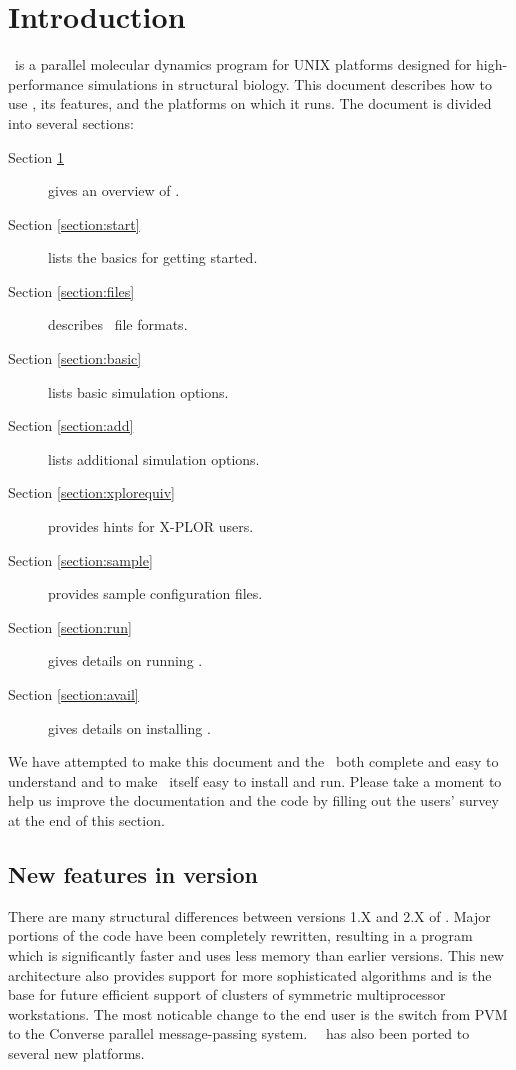 \section{Introduction}
\label{section:intro}

\NAMD\ is a parallel molecular dynamics program for UNIX 
platforms designed for high-performance 
simulations in structural biology.  This document describes how to use 
\NAMD, its features, and the platforms on which it runs.
The document is divided into several sections:
\begin{description}
\item[Section \ref{section:intro}] gives an overview of \NAMD.
\item[Section \ref{section:start}] lists the basics for getting started.
\item[Section \ref{section:files}] describes \NAMD\ file formats.
\item[Section \ref{section:basic}] lists basic simulation options.
\item[Section \ref{section:add}] lists additional simulation options.
\item[Section \ref{section:xplorequiv}] provides hints for X-PLOR users.
\item[Section \ref{section:sample}] provides sample configuration files.
\item[Section \ref{section:run}] gives details on running \NAMD.
\item[Section \ref{section:avail}] gives details on installing \NAMD.
\end{description}

We have attempted to make this document and the \PG\ both
complete and easy to understand and to make \NAMD\ itself
easy to install and run.  Please take a moment to help us improve
the documentation and the code by filling out the users' survey
at the end of this section.

\subsection{New features in version \NAMDVER}

There are many structural differences between versions 1.X and 2.X of \NAMD.
Major portions of the code have been completely rewritten, resulting in a program which is significantly faster and uses less memory than earlier versions.
This new architecture also provides support for more sophisticated algorithms and is the base for future efficient support of clusters of symmetric multiprocessor workstations.
The most noticable change to the end user is the switch from PVM to the Converse parallel message-passing system.
\NAMD\ \NAMDVER\ has also been ported to several new platforms.

